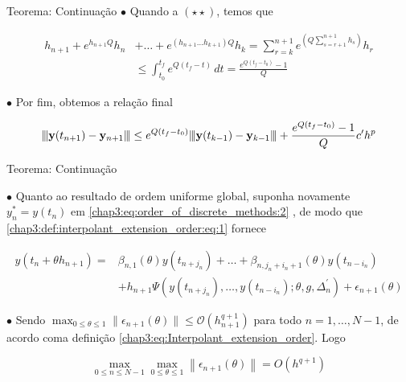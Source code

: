 \documentclass{beamer}
\newcommand{\vertiii}[1]{{\left\vert\kern-0.25ex\left\vert\kern-0.25ex\left\vert #1 
    \right\vert\kern-0.25ex\right\vert\kern-0.25ex\right\vert}}
\theoremstyle{plain}
\theoremstyle{definition}
\begin{document}

\begin{frame}{Teorema: Continuação}
    \noindent
    \phantom{aa} $\bullet$ Quando a $(\star \star)$, temos que

    

    \[
        \begin{split}
            h_{n+1} + e^{h_{n+1}Q}h_n &+ \dots + e^{(h_{n+1} \dots h_{k+1})Q}h_k = 
            \sum_{r = k}^{n+1}e^{\left( Q \sum_{s = r + 1}^{n+1}h_s \right)} h_r \\
            &\leq \int_{t_0}^{t_f} e^{Q(t_f - t)} \, dt = \frac{e^{Q(t_f - t_0)} - 1}{Q}
        \end{split}
    \]

    \phantom{aa} $\bullet$ Por fim, obtemos a relação final


    \[
      \vertiii{  \mathbf{y}(t_{n+1})-\mathbf{y}_{n+1} } \leq e^{Q(t_{f}-t_{0})} \vertiii{ \mathbf{y}(t_{k-1})-\mathbf{y}_{k-1} }
      +\frac{e^{Q(t_{f}-t_{0})}-1}{Q} c' h^{p}
    \]
\end{frame}




\begin{frame}{Teorema: Continuação}

    \phantom{aa} $\bullet$ Quanto ao resultado de ordem uniforme global, suponha novamente \(y_{n}^{*}=y\left(t_{n}\right)\) em \eqref{chap3:eq:order_of_discrete_methods:2} , de modo que \eqref{chap3:def:interpolant_extension_order:eq:1} fornece 

    \begin{equation}
      \begin{aligned}
        y(t_{n}+\theta h_{n+1})= & \beta_{n, 1}(\theta) y(t_{n+j_{n}})+\ldots+\beta_{n, j_{n}+i_{n}+1}(\theta) y(t_{n-i_{n}}) \\
        & +h_{n+1} \Psi(y(t_{n+j_{n}}), \ldots, y(t_{n-i_{n}}) ; \theta, g, \Delta_{n}^{\prime})+\epsilon_{n+1}(\theta) 
      \end{aligned}
      \label{chap3:teo:ODE_methods_convergence:eq:7}
    \end{equation}

    \noindent
    \phantom{aa} $\bullet$ Sendo $\max _{0 \leq \theta \leq 1}\|\epsilon_{n+1}(\theta)\| \leq \mathcal{O}(h_{n+1}^{q+1})$ para todo $n = 1, \dots, N-1$, de acordo coma definição \eqref{chap3:eq:Interpolant_extension_order}. Logo

    \begin{equation}
      \max _{0 \leq n \leq N-1} \max _{0 \leq \theta \leq 1}\left\|\epsilon_{n+1}(\theta)\right\|=O\left(h^{q+1}\right)
      \label{chap3:teo:ODE_methods_convergence:eq:8}
    \end{equation}


\end{frame}
\end{document}
